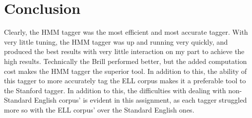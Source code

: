 \documentclass[11pt,a4paper]{article}
\begin{document}
\section{Conclusion}

Clearly, the HMM tagger was the most efficient and most accurate tagger. With
very little tuning, the HMM tagger was up and running very quickly, and produced
the best results with very little interaction on my part to achieve the high results.
Technically the Brill performed better, but the added computation cost
makes the HMM tagger the superior tool. In addition to this, the ability
of this tagger to more accurately tag the ELL corpus makes it a preferable
tool to the Stanford tagger. In addition to this, the difficulties with
dealing with non-Standard English corpus' is evident in this assignment, as each
tagger struggled more so with the ELL corpus' over the Standard English ones.
\end{document}
